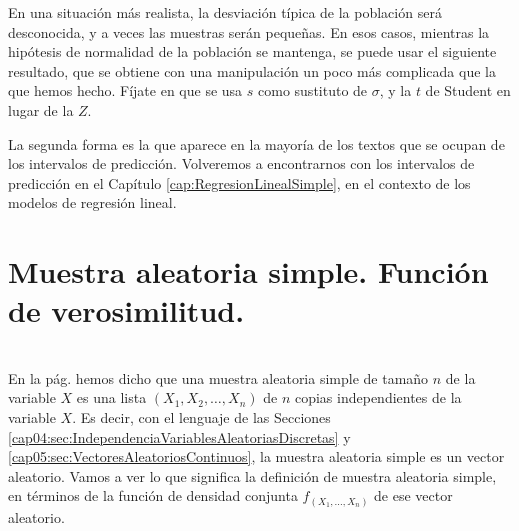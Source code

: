 En una situación más realista, la desviación típica de la población será desconocida, y a veces las muestras serán pequeñas. En esos casos, mientras la hipótesis de normalidad de la población se mantenga, se puede usar el siguiente resultado, que se obtiene con una manipulación un poco más complicada que la que hemos hecho. Fíjate en que se usa $s$ como sustituto de $\sigma$, y la $t$ de Student en lugar de la $Z$.
    \begin{center}
    \end{center}
La segunda forma es la que aparece en la mayoría de los textos que se ocupan de los intervalos de predicción. Volveremos a encontrarnos con los intervalos de predicción en el Capítulo \ref{cap:RegresionLinealSimple}, en el contexto de los modelos de regresión lineal.


\section{Muestra aleatoria simple. Función de verosimilitud.}
\label{cap06:sec:MuestraAleatoriaSimpleFuncionVerosimilitud}
\\

En la pág. \pageref{cap06:ecu:MediaMuestral} hemos dicho que una muestra aleatoria
simple de tamaño $n$ de la variable $X$ es una lista $(X_1,X_2,\ldots,X_n)$           de $n$ copias {\sf independientes} de la variable $X$. Es decir, con el lenguaje de las Secciones \ref{cap04:sec:IndependenciaVariablesAleatoriasDiscretas} y \ref{cap05:sec:VectoresAleatoriosContinuos}, la muestra aleatoria simple es un vector aleatorio. Vamos a ver lo que significa la definición de muestra aleatoria simple, en términos de la función de densidad conjunta $f_{(X_1,\ldots,X_n)}$ de ese vector aleatorio.

